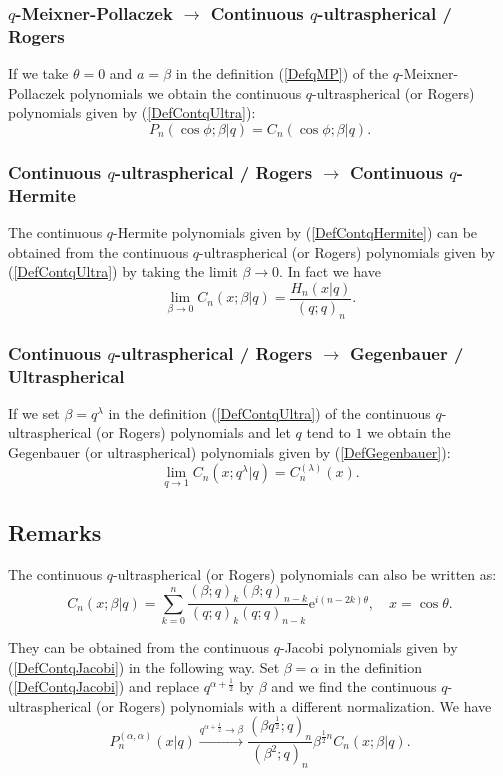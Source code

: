 \documentclass[envcountchap,graybox]{svmono}
\newcounter{rom}
\newcommand{\e}{\textrm{e}}
\begin{document}
\subsubsection*{$q$-Meixner-Pollaczek $\rightarrow$ Continuous $q$-ultraspherical /
Rogers}
If we take $\theta=0$ and $a=\beta$ in the definition (\ref{DefqMP}) of the
$q$-Meixner-Pollaczek polynomials we obtain the continuous
$q$-ultraspherical (or Rogers) polynomials given by (\ref{DefContqUltra}):
$$P_n(\cos\phi;\beta|q)=C_n(\cos\phi;\beta|q).$$

\subsubsection*{Continuous $q$-ultraspherical / Rogers $\rightarrow$ Continuous $q$-Hermite}
The continuous $q$-Hermite polynomials given by (\ref{DefContqHermite})
can be obtained from the continuous $q$-ultraspherical (or Rogers)
polynomials given by (\ref{DefContqUltra}) by taking the limit
$\beta\rightarrow 0$. In fact we have
\begin{equation}
\lim_{\beta\rightarrow 0}C_n(x;\beta|q)=\frac{H_n(x|q)}{(q;q)_n}.
\end{equation}

\subsubsection*{Continuous $q$-ultraspherical / Rogers $\rightarrow$ Gegenbauer /
Ultra\-spherical}
If we set $\beta=q^{\lambda}$ in the definition (\ref{DefContqUltra}) of the
continuous $q$-ultraspherical (or Rogers) polynomials and let $q$ tend to $1$ we obtain
the Gegenbauer (or ultraspherical) polynomials given by (\ref{DefGegenbauer}):
\begin{equation}
\lim_{q\rightarrow 1}C_n(x;q^{\lambda}|q)=C_n^{(\lambda)}(x).
\end{equation}

\subsection*{Remarks} 
The continuous $q$-ultraspherical (or Rogers) polynomials
can also be written as:
$$C_n(x;\beta|q)=\sum_{k=0}^n\frac{(\beta;q)_k(\beta;q)_{n-k}}{(q;q)_k(q;q)_{n-k}}
\e^{i(n-2k)\theta},\quad x=\cos\theta.$$

\noindent
They can be obtained from the continuous $q$-Jacobi polynomials given by
(\ref{DefContqJacobi}) in the following way. Set $\beta=\alpha$ in the definition
(\ref{DefContqJacobi}) and replace $q^{\alpha+\frac{1}{2}}$ by $\beta$ and we find
the continuous $q$-ultraspherical (or Rogers) polynomials with a different
normalization. We have
$$P_n^{(\alpha,\alpha)}(x|q)\stackrel{q^{\alpha+\frac{1}{2}}\rightarrow\beta}{\longrightarrow}
\frac{(\beta q^{\frac{1}{2}};q)_n}{(\beta^2;q)_n}\beta^{\frac{1}{2}n}C_n(x;\beta|q).$$
\end{document}

